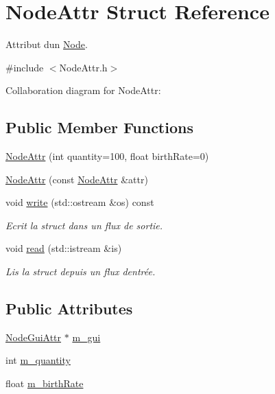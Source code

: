 \hypertarget{struct_node_attr}{}\section{Node\+Attr Struct Reference}
\label{struct_node_attr}


Attribut d\textquotesingle{}un \mbox{\hyperlink{class_node}{Node}}.  




{\ttfamily \#include $<$Node\+Attr.\+h$>$}



Collaboration diagram for Node\+Attr\+:
\subsection*{Public Member Functions}
\begin{DoxyCompactItemize}
\item 
\mbox{\hyperlink{struct_node_attr_a8e2bb0b1d6c9a9463c8c889c449bf25d}{Node\+Attr}} (int quantity=100, float birth\+Rate=0)
\item 
\mbox{\hyperlink{struct_node_attr_a212fd175b38b0d487ca604f096486afc}{Node\+Attr}} (const \mbox{\hyperlink{struct_node_attr}{Node\+Attr}} \&attr)
\item 
void \mbox{\hyperlink{struct_node_attr_a689f2d11e05d5cbf82f8b4ddff2dc658}{write}} (std\+::ostream \&os) const
\begin{DoxyCompactList}\small\item\em Ecrit la struct dans un flux de sortie. \end{DoxyCompactList}\item 
void \mbox{\hyperlink{struct_node_attr_a33c9654fe14019595e13bab7dde6cfdc}{read}} (std\+::istream \&is)
\begin{DoxyCompactList}\small\item\em Lis la struct depuis un flux d\textquotesingle{}entrée. \end{DoxyCompactList}\end{DoxyCompactItemize}
\subsection*{Public Attributes}
\begin{DoxyCompactItemize}
\item 
\mbox{\hyperlink{struct_node_gui_attr}{Node\+Gui\+Attr}} $\ast$ \mbox{\hyperlink{struct_node_attr_ab879f09d2cedd542d240f529062c495f}{m\+\_\+gui}}
\item 
int \mbox{\hyperlink{struct_node_attr_a4f41a824fc2c1c549673ee35999b1133}{m\+\_\+quantity}}
\item 
float \mbox{\hyperlink{struct_node_attr_a9bd12eee0adc8d7a8686d425d749ada8}{m\+\_\+birth\+Rate}}
\end{DoxyCompactItemize}


